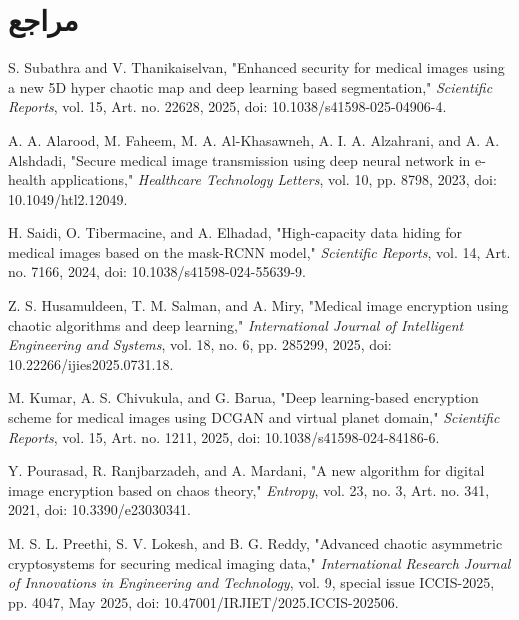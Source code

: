 \clearpage\chapter*{مراجع}
\begin{LTR}\ReferenceLatinFont\fontsize{12}{14.4}\selectfont
\begin{list}{}{\setlength{\leftmargin}{10mm}\setlength{\labelwidth}{8mm}\setlength{\itemsep}{8pt}}
\item[\lr{[1]}]\hypertarget{ref-1}{} S. Subathra and V. Thanikaiselvan, "Enhanced security for medical images using a new 5D hyper chaotic map and deep learning based segmentation," \textit{Scientific Reports}, vol. 15, Art. no. 22628, 2025, doi: 10.1038/s41598{-}025{-}04906{-}4.
\item[\lr{[2]}]\hypertarget{ref-2}{} A. A. Alarood, M. Faheem, M. A. Al{-}Khasawneh, A. I. A. Alzahrani, and A. A. Alshdadi, "Secure medical image transmission using deep neural network in e{-}health applications," \textit{Healthcare Technology Letters}, vol. 10, pp. 8798, 2023, doi: 10.1049/htl2.12049.
\item[\lr{[3]}]\hypertarget{ref-3}{} H. Saidi, O. Tibermacine, and A. Elhadad, "High{-}capacity data hiding for medical images based on the mask{-}RCNN model," \textit{Scientific Reports}, vol. 14, Art. no. 7166, 2024, doi: 10.1038/s41598{-}024{-}55639{-}9.
\item[\lr{[4]}]\hypertarget{ref-4}{} Z. S. Husamuldeen, T. M. Salman, and A. Miry, "Medical image encryption using chaotic algorithms and deep learning," \textit{International Journal of Intelligent Engineering and Systems}, vol. 18, no. 6, pp. 285299, 2025, doi: 10.22266/ijies2025.0731.18.
\item[\lr{[5]}]\hypertarget{ref-5}{} M. Kumar, A. S. Chivukula, and G. Barua, "Deep learning{-}based encryption scheme for medical images using DCGAN and virtual planet domain," \textit{Scientific Reports}, vol. 15, Art. no. 1211, 2025, doi: 10.1038/s41598{-}024{-}84186{-}6.
\item[\lr{[6]}]\hypertarget{ref-6}{} Y. Pourasad, R. Ranjbarzadeh, and A. Mardani, "A new algorithm for digital image encryption based on chaos theory," \textit{Entropy}, vol. 23, no. 3, Art. no. 341, 2021, doi: 10.3390/e23030341.
\item[\lr{[7]}]\hypertarget{ref-7}{} M. S. L. Preethi, S. V. Lokesh, and B. G. Reddy, "Advanced chaotic asymmetric cryptosystems for securing medical imaging data," \textit{International Research Journal of Innovations in Engineering and Technology}, vol. 9, special issue ICCIS{-}2025, pp. 4047, May 2025, doi: 10.47001/IRJIET/2025.ICCIS{-}202506.

\end{list}
\end{LTR}
